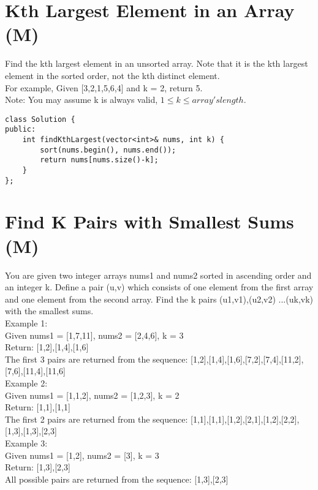 \section{Kth Largest Element in an Array (M)}
Find the kth largest element in an unsorted array. Note that it is the kth largest element in the sorted order, not the kth distinct element.\\

For example,
Given [3,2,1,5,6,4] and k = 2, return 5.\\

Note:
You may assume k is always valid, $1 \leq k \leq array's length$.\\

\begin{lstlisting}
class Solution {
public:
    int findKthLargest(vector<int>& nums, int k) {   
        sort(nums.begin(), nums.end());
        return nums[nums.size()-k];
    }
};
\end{lstlisting}


\section{Find K Pairs with Smallest Sums (M)}
You are given two integer arrays nums1 and nums2 sorted in ascending order and an integer k. Define a pair (u,v) which consists of one element from the first array and one element from the second array. Find the k pairs (u1,v1),(u2,v2) ...(uk,vk) with the smallest sums.\\

Example 1:\\
Given nums1 = [1,7,11], nums2 = [2,4,6],  k = 3\\
Return: [1,2],[1,4],[1,6]\\
The first 3 pairs are returned from the sequence:
[1,2],[1,4],[1,6],[7,2],[7,4],[11,2],[7,6],[11,4],[11,6]\\

Example 2:\\
Given nums1 = [1,1,2], nums2 = [1,2,3],  k = 2\\
Return: [1,1],[1,1]\\
The first 2 pairs are returned from the sequence:
[1,1],[1,1],[1,2],[2,1],[1,2],[2,2],[1,3],[1,3],[2,3]\\

Example 3:\\
Given nums1 = [1,2], nums2 = [3],  k = 3 \\
Return: [1,3],[2,3]\\
All possible pairs are returned from the sequence:
[1,3],[2,3]\\

